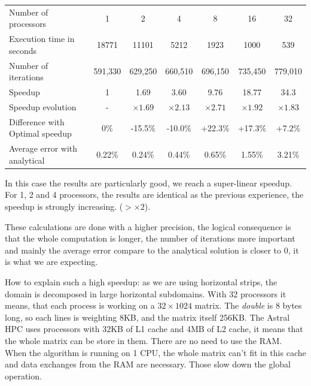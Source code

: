 \documentclass[a4paper,11pt]{article}
\begin{document}


\vspace{2em}
\hspace{-5em}
\begin{tabular}{l | c | c | c | c | c | c}
Number of processors & 1 & 2 & 4 & 8 & 16 & 32 \\
Execution time in seconds & 18771 & 11101 & 5212 & 1923 & 1000 & 539 \\
Number of iterations & 591,330 & 629,250 & 660,510 & 696,150 & 735,450 & 779,010 \\
Speedup & 1 & 1.69 & 3.60 & 9.76 & 18.77 & 34.3 \\
Speedup evolution & - & $\times1.69$ & $\times2.13$ & $\times2.71$ & $\times1.92$  & $\times1.83$ \\
Difference with Optimal speedup & 0\% & -15.5\% & -10.0\% & +22.3\% & +17.3\% & +7.2\% \\
Average error with analytical & 0.22\% & 0.24\% & 0.44\% & 0.65\% & 1.55\% & 3.21\%
\end{tabular}
\vspace{1em}

In this case the results are particularly good, we reach a super-linear speedup. For 1, 2 and 4 processors,
the results are identical as the previous experience, the speedup is strongly increasing. ($> \times2$).

\vspace{1em}
These calculations are done with a higher precision, the logical consequence is that the whole computation
is longer, the number of iterations more important and mainly the average error compare to the analytical solution
is closer to 0, it is what we are expecting.

\vspace{1em}
How to explain such a high speedup: as we are using horizontal strips, the domain is decomposed in large horizontal subdomains.
With 32 processors it means, that each process is working on a $32\times1024$ matrix. The \textit{double} is 8 bytes long,
so each lines is weighting 8KB, and the matrix itself 256KB. The Astral HPC uses processors with 32KB of L1 cache and 4MB of
L2 cache, it means that the whole matrix can be store in them. There are no need to use the RAM. When the algorithm
is running on 1 CPU, the whole matrix can't fit in this cache and data exchanges from the RAM are necessary. Those slow down
the global operation.
\end{document}
